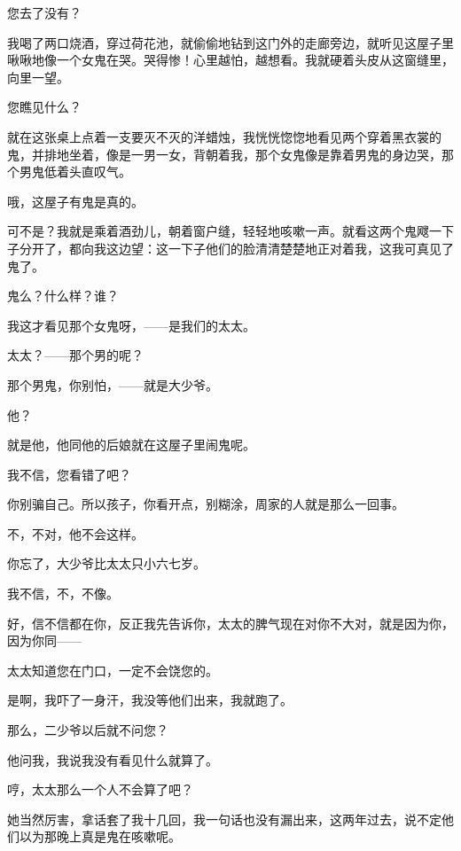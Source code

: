 您去了没有？

我喝了两口烧酒，穿过荷花池，就偷偷地钻到这门外的走廊旁边，就听见这屋子里啾啾地像一个女鬼在哭。哭得惨！心里越怕，越想看。我就硬着头皮从这窗缝里，向里一望。

您瞧见什么？

就在这张桌上点着一支要灭不灭的洋蜡烛，我恍恍惚惚地看见两个穿着黑衣裳的鬼，并排地坐着，像是一男一女，背朝着我，那个女鬼像是靠着男鬼的身边哭，那个男鬼低着头直叹气。

哦，这屋子有鬼是真的。

可不是？我就是乘着酒劲儿，朝着窗户缝，轻轻地咳嗽一声。就看这两个鬼飕一下子分开了，都向我这边望：这一下子他们的脸清清楚楚地正对着我，这我可真见了鬼了。

鬼么？什么样？谁？

我这才看见那个女鬼呀，——是我们的太太。

太太？——那个男的呢？

那个男鬼，你别怕，——就是大少爷。

他？

就是他，他同他的后娘就在这屋子里闹鬼呢。

我不信，您看错了吧？

你别骗自己。所以孩子，你看开点，别糊涂，周家的人就是那么一回事。

不，不对，他不会这样。

你忘了，大少爷比太太只小六七岁。

我不信，不，不像。

好，信不信都在你，反正我先告诉你，太太的脾气现在对你不大对，就是因为你，因为你同——

太太知道您在门口，一定不会饶您的。

是啊，我吓了一身汗，我没等他们出来，我就跑了。

那么，二少爷以后就不问您？

他问我，我说我没有看见什么就算了。

哼，太太那么一个人不会算了吧？

她当然厉害，拿话套了我十几回，我一句话也没有漏出来，这两年过去，说不定他们以为那晚上真是鬼在咳嗽呢。

